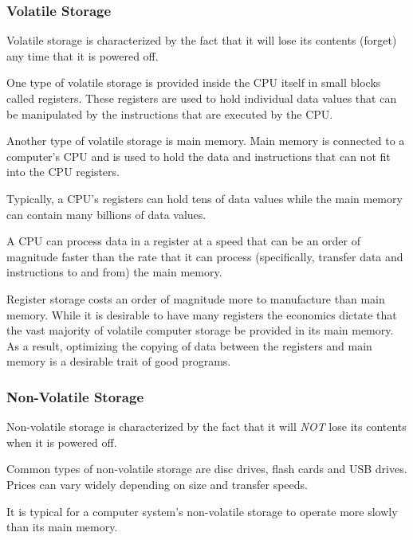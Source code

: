 \subsubsection{Volatile Storage}

Volatile storage is characterized by the fact that it will lose its
contents (forget) any time that it is powered off.

One type of volatile storage is provided inside the CPU itself in 
small blocks called \glspl{register}.  These registers are used to 
hold individual data values that can be manipulated by the instructions
that are executed by the CPU.  

Another type of volatile storage is main memory.
Main memory is connected to a computer's CPU and is used to hold
the data and instructions that can not fit into the CPU registers.

Typically, a CPU's registers can hold tens of data values while
the main memory can contain many billions of data values.

A CPU can process data in a register at a speed that can be an order 
of magnitude faster than the rate that it can process (specifically,
transfer data and instructions to and from) the main memory.  

Register storage costs an order of magnitude more to manufacture than
main memory.  While it is desirable to have many registers the economics 
dictate that the vast majority of volatile computer storage be provided
in its main memory.  As a result, optimizing the copying of data between 
the registers and main memory is a desirable trait of good programs.

\subsubsection{Non-Volatile Storage}

Non-volatile storage is characterized by the fact that it will {\em NOT} 
lose its contents when it is powered off.

Common types of non-volatile storage are disc drives, flash cards and USB 
drives.  Prices can vary widely depending on size and transfer speeds.

It is typical for a computer system's non-volatile storage to operate
more slowly than its main memory.


